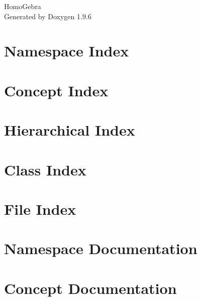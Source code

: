 \documentclass[twoside]{book}
\newcommand{\+}{\discretionary{\mbox{\scriptsize$\hookleftarrow$}}{}{}}
\newcommand{\clearemptydoublepage}{%
    \newpage{\pagestyle{empty}\cleardoublepage}%
  }
\begin{document}
  \raggedbottom
    \hypersetup{pageanchor=false,
                bookmarksnumbered=true,
                pdfencoding=unicode
               }
  \begin{titlepage}
  \vspace*{7cm}
  \begin{center}%
  {\Large Homo\+Gebra}\\
  \vspace*{1cm}
  {\large Generated by Doxygen 1.9.6}\\
  \end{center}
  \end{titlepage}
  \clearemptydoublepage
  \tableofcontents
  \clearemptydoublepage
  \hypersetup{pageanchor=true}
\chapter{Namespace Index}

\chapter{Concept Index}

\chapter{Hierarchical Index}

\chapter{Class Index}

\chapter{File Index}

\chapter{Namespace Documentation}

\chapter{Concept Documentation}

\end{document}
